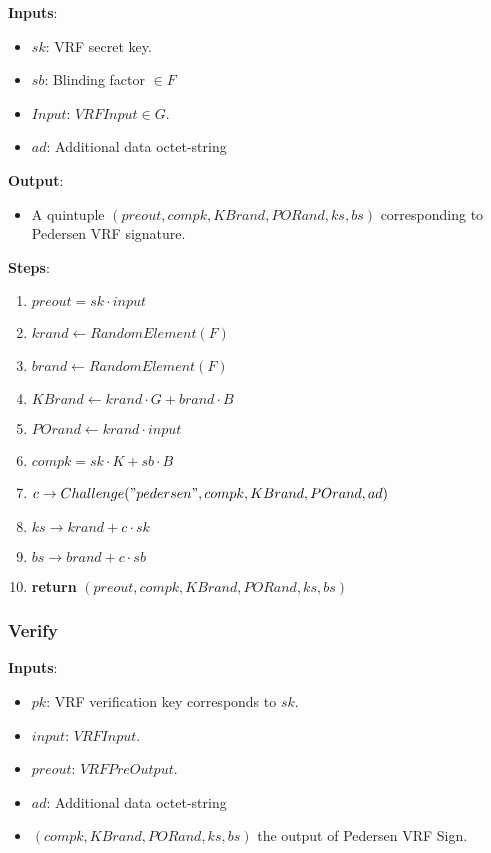 \documentclass[
]{article}
\providecommand{\tightlist}{%
  \setlength{\itemsep}{0pt}\setlength{\parskip}{0pt}}
\begin{document}
\textbf{Inputs}:

\begin{itemize}
\tightlist
\item
  \(sk\): VRF secret key.
\item
  \(sb\): Blinding factor \(\in F\)
\item
  \(Input\): \(VRFInput \in G\).
\item
  \(ad\): Additional data octet-string
\end{itemize}

\textbf{Output}:

\begin{itemize}
\tightlist
\item
  A quintuple \((preout, compk, KBrand, PORand, ks, bs)\) corresponding
  to Pedersen VRF signature.
\end{itemize}

\textbf{Steps}:

\begin{enumerate}
\def\labelenumi{\arabic{enumi}.}
\tightlist
\item
  \(preout = sk \cdot input\)
\item
  \(krand \leftarrow RandomElement(F)\)
\item
  \(brand \leftarrow RandomElement(F)\)
\item
  \(KBrand \leftarrow krand \cdot G + brand \cdot B\)
\item
  \(POrand \leftarrow krand \cdot input\)
\item
  \(compk = sk \cdot K + sb \cdot B\)
\item
  \(c \rightarrow Challenge("pedersen", compk, KBrand, POrand, ad)\)
\item
  \(ks \rightarrow krand + c \cdot sk\)
\item
  \(bs \rightarrow brand + c \cdot sb\)
\item
  \textbf{return} \((preout, compk, KBrand, PORand, ks, bs)\)
\end{enumerate}

\hypertarget{verify}{%
\subsubsection{Verify}\label{verify}}

\textbf{Inputs}:

\begin{itemize}
\tightlist
\item
  \(pk\): VRF verification key corresponds to \(sk\).
\item
  \(input\): \(VRFInput\).
\item
  \(preout\): \(VRFPreOutput\).
\item
  \(ad\): Additional data octet-string
\item
  \((compk, KBrand, PORand, ks, bs)\) the output of Pedersen VRF Sign.
\end{itemize}
\end{document}
